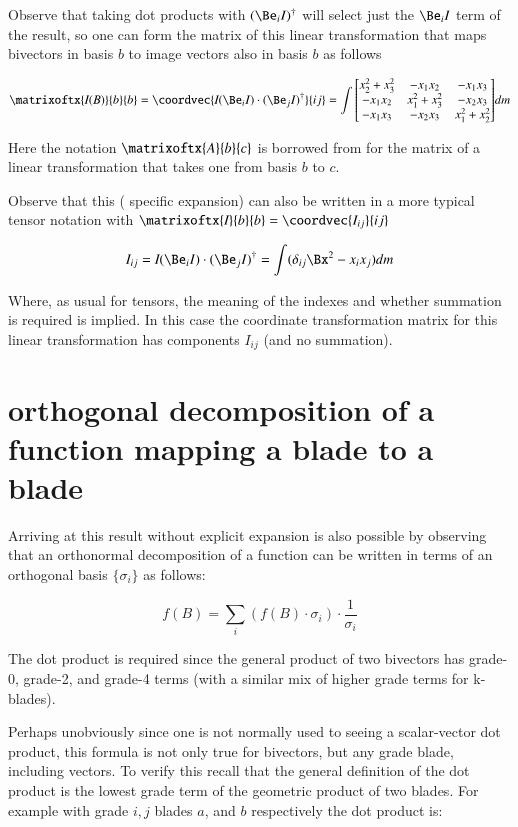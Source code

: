 Observe that taking dot products with $(\Be_i I)^\dagger$ will select just the $\Be_i I$ term of the result, so one can
form the matrix of this linear transformation that maps bivectors in basis $b$ to image vectors also in basis $b$ as follows

\[
\matrixoftx{\emph{I}(B)}{b}{b}
=
\coordvec{\emph{I}(\Be_i I) \cdot (\Be_j I)^\dagger}{ij}
=
\int {\begin{bmatrix}
x_2^2 + x_3^2  & - x_1 x_2  & - x_1 x_3 \\
-x_1 x_2  & x_1^2 + x_3^2  & - x_2 x_3  \\
-x_1 x_3  & -x_2 x_3  & x_1^2 + x_2^2  \\
\end{bmatrix}} dm
\]

Here the notation $\matrixoftx{A}{b}{c}$ is borrowed from
\cite{damiano1988cla} for the matrix of a linear transformation that
takes one from basis $b$ to $c$.

Observe that this ( specific expansion) can also be written in a more
typical tensor notation with $\matrixoftx{\emph{I}}{b}{b} = \coordvec{I_{ij}}{ij}$

\[
I_{ij} 
= \emph{I}(\Be_i I) \cdot (\Be_j I)^\dagger 
= \int (\delta_{ij} \Bx^2 - x_i x_j) dm
\]

Where, as usual for tensors, the meaning of the indexes and whether summation is required is implied.  In this case
the coordinate transformation matrix for this linear transformation has components $I_{ij}$ (and no summation).

\section{orthogonal decomposition of a function mapping a blade to a blade }

Arriving at this result without explicit expansion is also possible by observing that an orthonormal decomposition of a 
function can be written in terms of an orthogonal basis $\{\sigma_i\}$ as follows:

\begin{equation}
f(B) = \sum_i (f(B) \cdot \sigma_i) \cdot \frac{1}{\sigma_i}
\end{equation}\label{eqn:itensor:bladeOrthogDecomp}

The dot product is required since the general product of two bivectors has grade-0, grade-2, and grade-4 terms (with a similar mix of higher grade terms for k-blades).

Perhaps unobviously since one is not normally used to seeing a scalar-vector dot product, this formula is not only true for bivectors, but any grade blade, including
vectors.  To verify this recall that the 
general definition of the dot product is the lowest grade term of the geometric product of two blades.  For example with grade $i,j$ blades $a$, and $b$ respectively
the dot product is:

